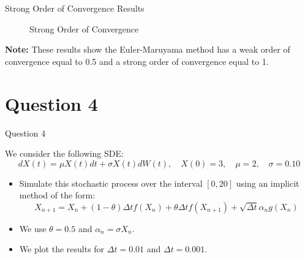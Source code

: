 \documentclass[compress,12pt]{beamer}
\begin{document}
\begin{frame}{Strong Order of Convergence Results}
\begin{itemize}
\begin{minipage}{0.4\textwidth}
\begin{figure}
                \caption{Strong Order of Convergence}
                \label{fig:enter-label}
            \end{figure}
                
            \end{minipage}
    \end{itemize}
    
    \textbf{Note:} These results show the Euler-Maruyama method has a weak order of convergence equal to 0.5 and a strong order of convergence equal to 1.
\end{frame}

\section{Question 4}
\begin{frame}{Question 4}

      We consider the following SDE:
      \[
      dX(t) = \mu X(t) dt + \sigma X(t) dW(t), \quad X(0)=3, \quad \mu=2 , \quad \sigma=0.10
      \]

      \begin{itemize}
            \item Simulate this stochastic process over the interval $[0,20]$ using an implicit method of the form:
            \[
            X_{n+1} = X_n + (1 - \theta) \Delta t f(X_n) + \theta \Delta t f(X_{n+1}) + \sqrt{\Delta t} \alpha_n g(X_n)
            \]
            \item We use $\theta = 0.5$ and $\alpha_n = \sigma X_n$.
            \item We plot the results for $\Delta t = 0.01$ and $\Delta t = 0.001$.
      \end{itemize}

\end{frame}
\end{document}
